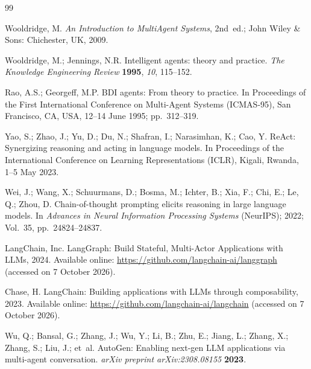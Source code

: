 \documentclass[make,article,submit,moreauthors,pdftex]{mdpi}
\begin{document}


\begin{thebibliography}{99}

Wooldridge, M.
\newblock \textit{An Introduction to MultiAgent Systems}, 2nd~ed.;
\newblock John Wiley \& Sons: Chichester, UK, 2009.

Wooldridge, M.; Jennings, N.R.
\newblock Intelligent agents: theory and practice.
\newblock \textit{The Knowledge Engineering Review} \textbf{1995}, \textit{10}, 115--152.

Rao, A.S.; Georgeff, M.P.
\newblock BDI agents: From theory to practice.
\newblock In Proceedings of the First International Conference on Multi-Agent Systems (ICMAS-95), San Francisco, CA, USA, 12--14 June 1995; pp.~312--319.

Yao, S.; Zhao, J.; Yu, D.; Du, N.; Shafran, I.; Narasimhan, K.; Cao, Y.
\newblock ReAct: Synergizing reasoning and acting in language models.
\newblock In Proceedings of the International Conference on Learning Representations (ICLR), Kigali, Rwanda, 1--5 May 2023.

Wei, J.; Wang, X.; Schuurmans, D.; Bosma, M.; Ichter, B.; Xia, F.; Chi, E.; Le, Q.; Zhou, D.
\newblock Chain-of-thought prompting elicits reasoning in large language models.
\newblock In \textit{Advances in Neural Information Processing Systems} (NeurIPS); 2022; Vol.~35, pp.~24824--24837.

LangChain, Inc.
\newblock LangGraph: Build Stateful, Multi-Actor Applications with LLMs, 2024.
\newblock Available online: \url{https://github.com/langchain-ai/langgraph} (accessed on 7 October 2026).

Chase, H.
\newblock LangChain: Building applications with LLMs through composability, 2023.
\newblock Available online: \url{https://github.com/langchain-ai/langchain} (accessed on 7 October 2026).

Wu, Q.; Bansal, G.; Zhang, J.; Wu, Y.; Li, B.; Zhu, E.; Jiang, L.; Zhang, X.; Zhang, S.; Liu, J.; et~al.
\newblock AutoGen: Enabling next-gen LLM applications via multi-agent conversation.
\newblock \textit{arXiv preprint arXiv:2308.08155} \textbf{2023}.


\end{thebibliography}
\end{document}
